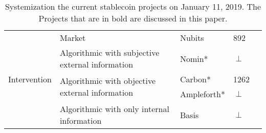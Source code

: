 \begin{table}[h!]
\begin{tabular}{|l|l|l|l|l|}
                                                                                                                 
\multirow{5}{*}{Intervention}                                                           
						& \multirow{1}{*}{Market} 										& Nubits & 892 \\ \cline{2-4}
						& \multirow{1}{*}{Algorithmic with subjective external information}  		& Nomin* & $\perp$  \\ \cline{2-4}
						& \multirow{2}{*}{Algorithmic with objective external information}  		& Carbon* & 1262 \\ \cline{3-4}
						&														& Ampleforth* & $\perp$ \\ \cline{2-4}
						& \multirow{1}{*}{Algorithmic with only internal information} 			& Basis & $\perp$ \\ \hline

\end{tabular}
\vspace{1em}
\caption{\footnotesize{Systemization the current stablecoin projects} on January 11, 2019. The Projects that are in bold are discussed in this paper.}
\label{tab:stablecoins}
\vspace{3em}
\end{table}

